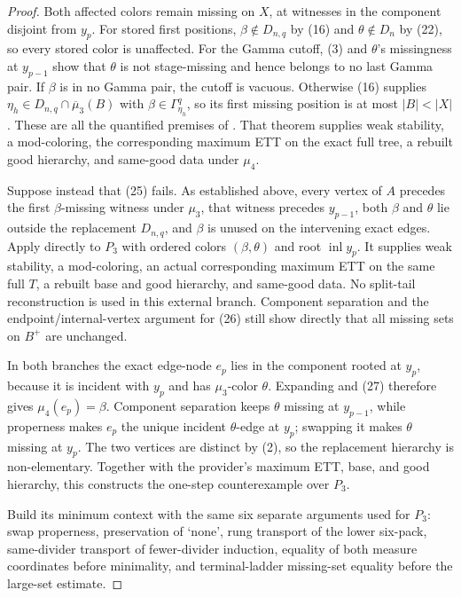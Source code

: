 \begin{proof}
Both affected colors remain missing on \(X\), at witnesses in the
component disjoint from \(y_p\).  For stored first positions,
\(\beta\notin D_{n,q}\) by (16) and \(\theta\notin D_n\) by (22), so
every stored color is unaffected.  For the Gamma cutoff, (3) and
\(\theta\)'s missingness at \(y_{p-1}\) show that \(\theta\) is not
stage-missing and hence belongs to no last Gamma pair.  If \(\beta\) is
in no Gamma pair, the cutoff is vacuous.  Otherwise (16) supplies
\(\eta_h\in D_{n,q}\cap\overline\mu_3(B)\) with
\(\beta\in\Gamma^q_{\eta_h}\), so its first missing position is at most
\(|B|<|X|\).  These are all the quantified premises of
.  That theorem supplies weak
stability, a mod-coloring, the corresponding maximum ETT on the exact
full tree, a rebuilt good hierarchy, and same-good data under \(\mu_4\).

Suppose instead that (25) fails.  As established above, every vertex of
\(A\) precedes the first \(\beta\)-missing witness under \(\mu_3\),
that witness precedes \(y_{p-1}\), both \(\beta\) and \(\theta\) lie
outside the replacement \(D_{n,q}\), and \(\beta\) is unused on the
intervening exact edges.  Apply  directly
to \(P_3\) with ordered colors \((\beta,\theta)\) and root
\(\operatorname{inl}y_p\).  It supplies weak stability, a mod-coloring,
an actual corresponding maximum ETT on the same full \(T\), a rebuilt
base and good hierarchy, and same-good data.  No split-tail
reconstruction is used in this external branch.  Component separation
and the endpoint/internal-vertex argument for (26) still show directly
that all missing sets on \(B^+\) are unchanged.

In both branches the exact edge-node \(e_p\) lies in the component rooted
at \(y_p\), because it is incident with \(y_p\) and has
\(\mu_3\)-color \(\theta\).  Expanding
 and (27) therefore gives
\(\mu_4(e_p)=\beta\).  Component separation keeps \(\theta\) missing at
\(y_{p-1}\), while properness makes \(e_p\) the unique incident
\(\theta\)-edge at \(y_p\); swapping it makes \(\theta\) missing at
\(y_p\).  The two vertices are distinct by (2), so the replacement
hierarchy is non-elementary.  Together with the provider's maximum ETT,
base, and good hierarchy, this constructs the one-step counterexample
over \(P_3\).

Build its minimum context with the same six separate arguments used for
\(P_3\): swap properness, preservation of `none', rung transport of the
lower six-pack, same-divider transport of fewer-divider induction,
equality of both measure coordinates before minimality, and
terminal-ladder missing-set equality before the large-set estimate.


\end{proof}
